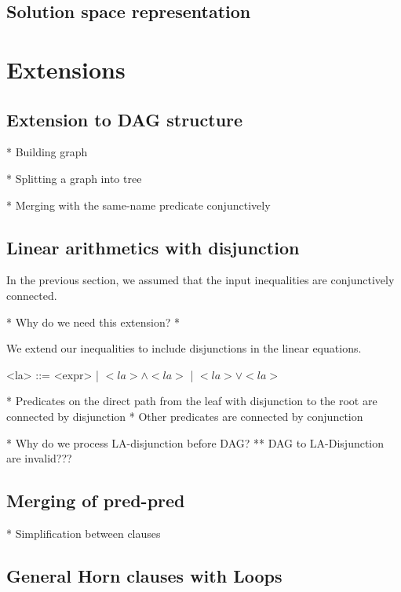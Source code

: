 \documentclass{llncs}
\begin{document}
\subsection{Solution space representation}


\section{Extensions}

\subsection{Extension to DAG structure}

* Building graph

* Splitting a graph into tree

* Merging with the same-name predicate conjunctively

\subsection{Linear arithmetics with disjunction}

In the previous section, we assumed that the input inequalities are
conjunctively connected.

* Why do we need this extension? *

We extend our inequalities to include disjunctions in the linear
equations.

\setlength{\grammarindent}{2em}
\begin{grammar}
<la> ::= <expr> | $<la> \wedge <la>$ | $<la> \vee <la>$
\end{grammar}

* Predicates on the direct path from the leaf with disjunction to the
root are connected by disjunction
* Other predicates are connected by conjunction


* Why do we process LA-disjunction before DAG?
** DAG to LA-Disjunction are invalid???


\subsection{Merging of pred-pred}

* Simplification between clauses


\subsection{General Horn clauses with Loops}
\end{document}
